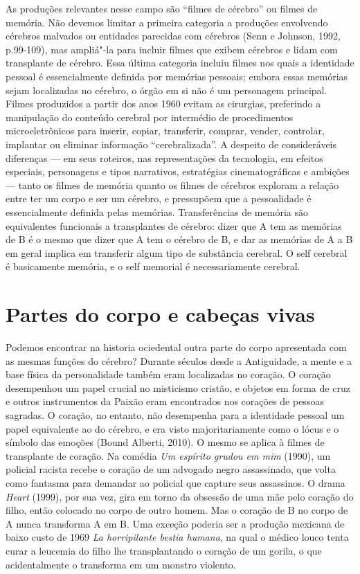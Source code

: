 As produções relevantes nesse campo são ``filmes de cérebro'' ou filmes
de memória. Não devemos limitar a primeira categoria a produções
envolvendo cérebros malvados ou entidades parecidas com cérebros (Senn e
Johnson, 1992, p.99-109), mas ampliá"-la para incluir filmes que exibem
cérebros e lidam com transplante de cérebro. Essa última categoria
incluiu filmes nos quais a identidade pessoal é essencialmente definida
por memórias pessoais; embora essas memórias sejam localizadas no
cérebro, o órgão em si não é um personagem principal. Filmes produzidos
a partir dos anos 1960 evitam as cirurgias, preferindo a manipulação do
conteúdo cerebral por intermédio de procedimentos microeletrônicos para
inserir, copiar, transferir, comprar, vender, controlar, implantar ou
eliminar informação ``cerebralizada''. A despeito de consideráveis
diferenças --- em seus roteiros, nas representações da tecnologia, em
efeitos especiais, personagens e tipos narrativos, estratégias
cinematográficas e ambições --- tanto os filmes de memória quanto os
filmes de cérebros exploram a relação entre ter um corpo e ser um
cérebro, e pressupõem que a pessoalidade é essencialmente definida pelas
memórias. Transferências de memória são equivalentes funcionais a
transplantes de cérebro: dizer que A tem as memórias de B é o mesmo que
dizer que A tem o cérebro de B, e dar as memórias de A a B em geral
implica em transferir algum tipo de substância cerebral. O self cerebral
é basicamente memória, e o self memorial é necessariamente cerebral.

\chapter{Partes do corpo e cabeças vivas}

Podemos encontrar na historia ociedental outra parte do corpo
apresentada com as mesmas funções do cérebro? Durante séculos desde a
Antiguidade, a mente e a base física da personalidade também eram
localizadas no coração. O coração desempenhou um papel crucial no
misticismo cristão, e objetos em forma de cruz e outros instrumentos da
Paixão eram encontrados nos corações de pessoas sagradas. O coração, no
entanto, não desempenha para a identidade pessoal um papel equivalente
ao do cérebro, e era visto majoritariamente como o lócus e o símbolo das
emoções (Bound Alberti, 2010). O mesmo se aplica à filmes de transplante
de coração. Na comédia \emph{Um espírito grudou em mim} (1990), um
policial racista recebe o coração de um advogado negro assassinado, que
volta como fantasma para demandar ao policial que capture seus
assassinos. O drama \emph{Heart} (1999), por sua vez, gira em torno da
obsessão de uma mãe pelo coração do filho, então colocado no corpo de
outro homem. Mas o coração de B no corpo de A nunca transforma A em B.
Uma exceção poderia ser a produção mexicana de baixo custo de 1969
\emph{La horripilante bestia humana}, na qual o médico louco tenta curar
a leucemia do filho lhe transplantando o coração de um gorila, o que
acidentalmente o transforma em um monstro violento.

